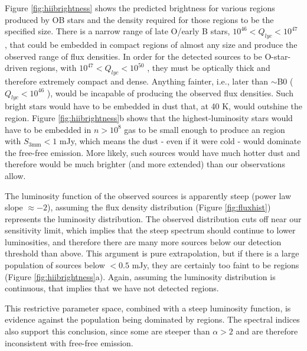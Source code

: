 \documentclass[twocolumn]{aastex61}
\begin{document}
Figure \ref{fig:hiibrightness} shows the predicted brightness for various \hii
regions produced by OB stars and the density required for those \hii regions
to be the specified size.  There is a narrow range of late O/early B stars,
$10^{46} < Q_{lyc} < 10^{47}$ \pers, that could be embedded in compact \hii
regions of almost any size and produce the observed range of flux densities.
In order for the detected sources to be O-star-driven \hii regions, with $10^{47}
< Q_{lyc} < 10^{50}$ \pers, they must be optically thick and therefore
extremely compact and dense.  
Anything fainter, i.e., later than $\sim$B0 ($Q_{lyc}<10^{46}$ \pers), would be
incapable of producing the observed flux densities.
Such bright stars would have to be embedded in dust that, at 40 K, would
outshine the \hii region.  Figure \ref{fig:hiibrightness}b shows that the
highest-luminosity stars would have to be embedded in $n>10^8$ \percc gas to be
small enough to produce an \hii region with $S_{3 \textrm{mm}}<1$ mJy, which means the
dust - even if it were cold - would dominate the free-free emission.
More likely, such sources would have much hotter dust
and therefore would be much brighter (and more extended) than our observations
allow.

The luminosity function of the observed sources is apparently steep (power law
slope $\approx-2$), assuming the flux density distribution (Figure
\ref{fig:fluxhist}) represents the luminosity distribution.  The observed
distribution cuts off near our sensitivity limit, which implies that the steep
spectrum should continue to lower luminosities, and therefore there are many
more sources below our detection threshold than above.  This argument is pure
extrapolation,  but if there is a large population of sources below $<0.5$ mJy,
they are certainly too faint to be \hii regions (Figure
\ref{fig:hiibrightness}a).  Again, assuming the luminosity distribution is
continuous, that implies that we have not detected \hii regions.

This restrictive parameter space, combined with a steep luminosity function, is
evidence against the population being dominated by \hii regions.  The spectral
indices also support this conclusion, since some are steeper than $\alpha>2$
and are therefore inconsistent with free-free emission.
\end{document}
